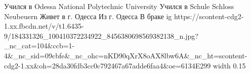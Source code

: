  
 
 
 
 

Учился в Odessa National Polytechnic University
Учился в Schule Schloss Neubeuern
Живет в г. Одесса
Из г. Одесса
В браке
\ifcmt
  ig https://scontent-cdg2-1.xx.fbcdn.net/v/t1.6435-9/184331326_100410372234922_8456380698569382138_n.jpg?_nc_cat=104&ccb=1-4&_nc_sid=09cbfe&_nc_ohc=nKD90qXrX8oAX8lbw6A&_nc_ht=scontent-cdg2-1.xx&oh=28da30fdb3cc0c792467a67adde6faa4&oe=6134E299
  width 0.15
\fi
